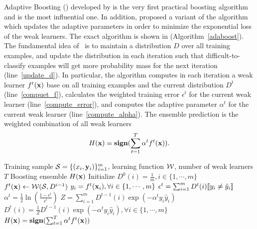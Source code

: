 {Adaptive Boosting (\adaboost) developed by \citet{Freund97a} is the very first practical boosting algorithm and is the most influential one.
In addition, \citet{Schapire99improved} proposed a variant of the algorithm which updates the adaptive parameters in order to minimize the exponential loss of the weak learners.
The exact algorithm is shown in (Algorithm~\ref{adaboost}).
The fundamental idea of \adaboost\ is to maintain a distribution $D$ over all training examples, and update the distribution in each iteration such that difficult-to-classify examples will get more probability mass for the next iteration (line~\ref{update_d}).
In particular, the algorithm computes in each iteration a weak learner $f^t(\mathbf {x})$ base on all training examples and the current distribution $D^{t}$ (line~\ref{compuet_f}), calculates the weighted training error $\epsilon^t$ for the current weak learner (line~\ref{compute_error}), and computes the adaptive parameter $\alpha^t$ for the current weak learner (line~\ref{compute_alpha}).
The ensemble prediction is the weighted combination of all weak learners
\begin{align*}
	H(\mathbf {x}) = \textbf{sign}(\sum_{t=1}^T\alpha^tf^t(\mathbf {x})).
\end{align*}
\begin{algorithm}
\caption{\adaboost}
\label{adaboost}
\begin{algorithmic}[1]
	\REQUIRE Training sample $\mathcal{S} = \{(x_i,\mathbf {y}_i)\}_{i=1}^m$, learning function $\mathcal{W}$, number of weak learners $T$
	\ENSURE Boosting ensemble $H(\mathbf {x})$
	\STATE Initialize $D^0(i)=\frac{1}{m},i\in\{1,\cdots,m\}$
		\STATE $f^t(\mathbf {x})\leftarrow\mathcal{W}(\mathcal{S},D^{i-1})$ \label{compuet_f}
		\STATE $y_i = f^t(\mathbf {x}_i),\forall i\in\{1,\cdots,m\}$
		\STATE $\epsilon^t = \sum_{i=1}^{m}D^t(i){\llbracket y_i\neq\hat{y}_i \rrbracket}$ \label{compute_error}
		\STATE $\alpha^{t} = \frac{1}{2}\ln\left(\frac{1-\epsilon^t}{\epsilon^t}\right)$ \label{compute_alpha}
		\STATE $Z=\sum_{i=1}^{m}D^{t-1}(i)\exp(-\alpha^ty_i\hat{y}_i)$
		\STATE $D^t(i) = \frac{1}{Z}D^{t-1}(i)\exp(-\alpha^ty_i\hat{y}_i),\forall i\in\{1,\cdots,m\}$ \label{update_d}
	\ENDFOR
	\RETURN $H(\mathbf {x}) = \textbf{sign}(\sum_{t=1}^T\alpha^tf^t(\mathbf {x}))$
\end{algorithmic}
\end{algorithm}

}
